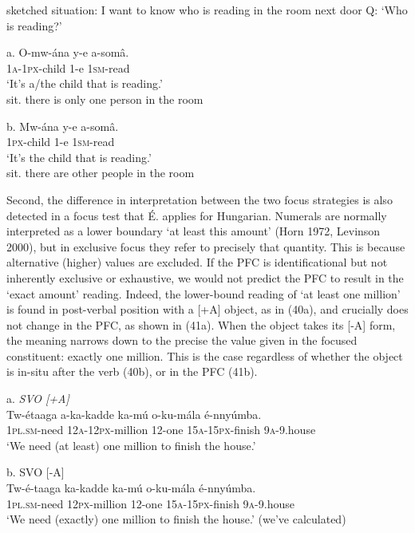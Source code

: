 \documentclass[output=paper]{langsci/langscibook}
\begin{document}
\ea
{sketched situation: I want to know who is reading in the room next door}
\glt   Q: ‘Who is reading?’
\z

\ea
\gll   a.  O-mw-ána  y-e  a-somâ.\\
         \textsc{1a}-\textsc{1px}-child  1-e  \textsc{1sm}-read\\
\glt     ‘It’s a/the child that is reading.’\\
sit. there is only one person in the room
\z

\ea
\gll   b.  Mw-ána  y-e  a-somâ.\\
         \textsc{1px}-child  1-e  \textsc{1sm}-read\\
\glt   ‘It’s the child that is reading.’\\
sit. there are other people in the room
\z

Second, the difference in interpretation between the two focus strategies is also detected in a focus test that É. \citet{Kiss2009} applies for Hungarian. Numerals are normally interpreted as a lower boundary ‘at least this amount’ (Horn 1972, Levinson 2000), but in exclusive focus they refer to precisely that quantity. This is because alternative (higher) values are excluded. If the PFC is identificational but not inherently exclusive or exhaustive, we would not predict the PFC to result in the ‘exact amount’ reading. Indeed, the lower-bound reading of ‘at least one million’ is found in post-verbal position with a [+A] object, as in (40a), and crucially does not change in the PFC, as shown in (41a). When the object takes its [-A] form, the meaning narrows down to the precise the value given in the focused constituent: exactly one million. This is the case regardless of whether the object is in-situ after the verb (40b), or in the PFC (41b).

\ea
{a.  \textit{SVO [+A]}}\\
\gll   Tw-étaaga  a-ka-kadde    ka-mú  o-ku-mála    é-nnyúmba.\\
       \textsc{1pl}.\textsc{sm}-need  \textsc{12a}-\textsc{12px}-million  12-one  \textsc{15a}-\textsc{15px}-finish  \textsc{9a}-9.house\\
\glt   ‘We need (at least) one million to finish the house.’
\z

\ea
{b.  SVO [-A]}\\
\gll Tw-é-taaga  ka-kadde  ka-mú  o-ku-mála    é-nnyúmba.\\
     \textsc{1pl}.\textsc{sm}-need  \textsc{12px}-million  12-one  \textsc{15a}-\textsc{15px}-finish  \textsc{9a}-9.house\\
\glt ‘We need (exactly) one million to finish the house.’ (we’ve calculated)
\z
\end{document}
